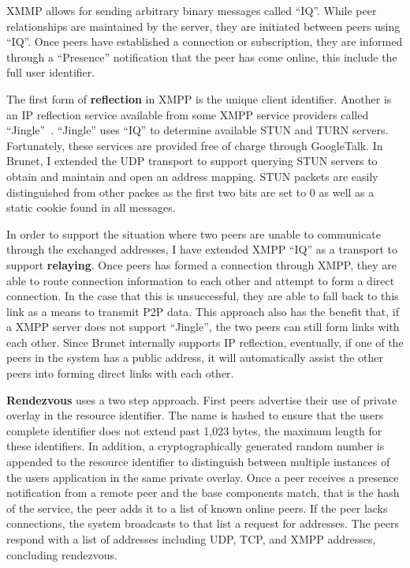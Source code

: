 XMMP allows for sending arbitrary binary messages called ``IQ''.  While peer
relationships are maintained by the server, they are initiated between peers
using ``IQ''.  Once peers have established a connection or subscription, they
are informed through a ``Presence'' notification that the peer has come online,
this include the full user identifier.

The first form of \textbf{reflection} in XMPP is the unique client identifier.
Another is an IP reflection service available from some XMPP service providers
called ``Jingle''~\cite{jingle}.  ``Jingle'' uses ``IQ'' to determine available
STUN and TURN servers.  Fortunately, these services are provided free of charge
through GoogleTalk.  In Brunet, I extended the UDP transport to support
querying STUN servers to obtain and maintain and open an address mapping.  STUN
packets are easily distinguished from other packes as the first two bits are
set to 0 as well as a static cookie found in all messages.

In order to support the situation where two peers are unable to communicate
through the exchanged addresses, I have extended XMPP ``IQ'' as a transport to
support \textbf{relaying}.  Once peers has formed a connection through XMPP,
they are able to route connection information to each other and attempt to form
a direct connection.  In the case that this is unsuccessful, they are able to
fall back to this link as a means to transmit P2P data.  This approach also has
the benefit that, if a XMPP server does not support ``Jingle'', the two peers
can still form links with each other.  Since Brunet internally supports IP
reflection, eventually, if one of the peers in the system has a public address,
it will automatically assist the other peers into forming direct links with
each other.

\textbf{Rendezvous} uses a two step approach.  First peers advertise their use
of private overlay in the resource identifier.  The name is hashed to ensure
that the users complete identifier does not extend past 1,023 bytes, the
maximum length for these identifiers.  In addition, a cryptographically
generated random number is appended to the resource identifier to distinguish
between multiple instances of the users application in the same private
overlay.  Once a peer receives a presence notification from a remote peer and
the base components match, that is the hash of the service, the peer adds it to
a list of known online peers.  If the peer lacks connections, the system
broadcasts to that list a request for addresses.  The peers respond with a list
of addresses including UDP, TCP, and XMPP addresses, concluding rendezvous.

